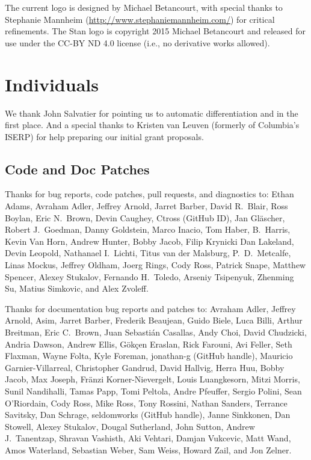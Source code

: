 The current logo is designed by Michael Betancourt, with special
thanks to Stephanie Mannheim (\url{http://www.stephaniemannheim.com/})
for critical refinements.  The Stan logo is copyright 2015 Michael
Betancourt and released for use under the CC-BY ND 4.0 license (i.e.,
no derivative works allowed).


\section*{Individuals}

We thank John Salvatier for pointing us to automatic differentiation
and \HMC in the first place.  And a special thanks to Kristen van
Leuven (formerly of Columbia's ISERP) for help preparing our initial
grant proposals.

\subsection*{Code  and Doc Patches}

Thanks for bug reports, code patches, pull requests, and diagnostics
to: 
Ethan Adams, 
Avraham Adler,
Jeffrey Arnold, 
Jarret Barber, 
David R.~Blair, 
Ross Boylan, 
Eric N.~Brown, 
Devin Caughey, 
Ctross (GitHub ID), 
Jan Gl\"ascher,
Robert J.\ Goedman,
Danny Goldstein,
Marco Inacio, 
Tom Haber,
B.~Harris, 
Kevin Van Horn, 
Andrew Hunter,
Bobby Jacob, 
Filip Krynicki
Dan Lakeland, 
Devin Leopold, 
Nathanael I.~Lichti,
Titus van der Malsburg,
P.~D.~Metcalfe, 
Linas Mockus,
Jeffrey Oldham, 
Joerg Rings,
Cody Ross,
Patrick Snape,
Matthew Spencer,
Alexey Stukalov,
Fernando H.~Toledo, 
Arseniy Tsipenyuk,
Zhenming Su,
Matius Simkovic, and
Alex Zvoleff.

Thanks for documentation bug reports and patches to: 
Avraham Adler,
Jeffrey Arnold,
Asim, 
Jarret Barber, 
Frederik Beaujean,
Guido Biele,
Luca Billi, 
Arthur Breitman,
Eric C.~Brown, 
Juan Sebasti\'an Casallas,
Andy Choi, 
David Chudzicki,
Andria Dawson, 
Andrew Ellis,
G\"{o}k\c{c}en Eraslan,
Rick Farouni,
Avi Feller,
Seth Flaxman, 
Wayne Folta, 
Kyle Foreman,
jonathan-g (GitHub handle),
Mauricio Garnier-Villarreal,
Christopher Gandrud,
David Hallvig,
Herra Huu,
Bobby Jacob,
Max Joseph,
Fr\"anzi Korner-Nievergelt,
Louis Luangkesorn, 
Mitzi Morris,
Sunil Nandihalli,
Tamas Papp, 
Tomi Peltola,
Andre Pfeuffer,
Sergio Polini,
Sean O'Riordain, 
Cody Ross, 
Mike Ross, 
Tony Rossini,
Nathan Sanders, 
Terrance Savitsky,
Dan Schrage,
seldomworks (GitHub handle),
Janne Sinkkonen, 
Dan Stowell, 
Alexey Stukalov,
Dougal Sutherland, 
John Sutton,
Andrew J.~Tanentzap,
Shravan Vashisth, 
Aki Vehtari,
Damjan Vukcevic,
Matt Wand,
Amos Waterland,
Sebastian Weber, 
Sam Weiss,
Howard Zail, and
Jon Zelner.

